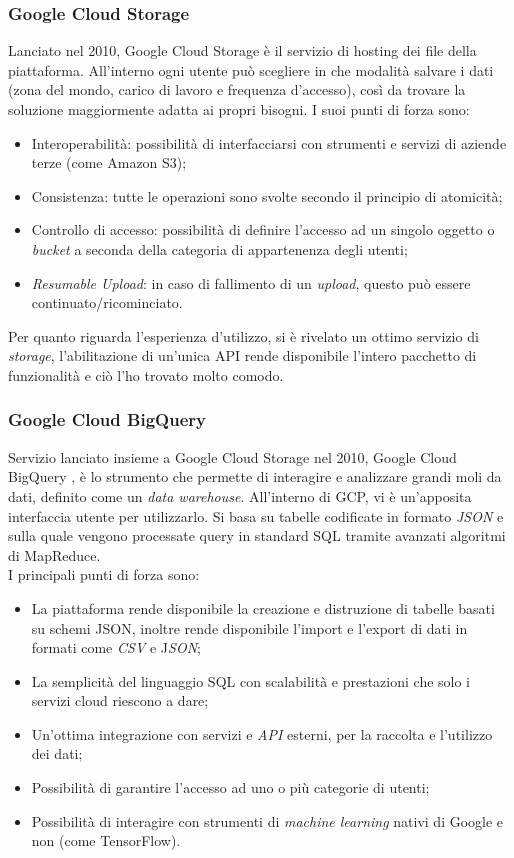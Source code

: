 \subsubsection{Google Cloud Storage}
Lanciato nel 2010, Google Cloud Storage è il servizio di hosting dei file della piattaforma. All'interno ogni utente può scegliere in che modalità salvare i dati (zona del mondo, carico di lavoro e frequenza d'accesso), così da trovare la soluzione maggiormente adatta ai propri bisogni.
I suoi punti di forza sono:
\begin{itemize}
	\item Interoperabilità: possibilità di interfacciarsi con strumenti e servizi di aziende terze (come Amazon S3);
	\item Consistenza: tutte le operazioni sono svolte secondo il principio di \Gls{atomicità};
	\item Controllo di accesso: possibilità di definire l'accesso ad un singolo oggetto o \emph{\gls{bucket}} a seconda della categoria di appartenenza degli utenti;
	\item \emph{Resumable Upload}: in caso di fallimento di un \emph{upload}, questo può essere continuato/ricominciato.
\end{itemize}

Per quanto riguarda l'esperienza d'utilizzo, si è rivelato un ottimo servizio di \emph{storage}, l'abilitazione di un'unica API rende disponibile l'intero pacchetto di funzionalità e ciò l'ho trovato molto comodo.
\subsubsection{Google Cloud BigQuery}
Servizio lanciato insieme a Google Cloud Storage nel 2010, Google Cloud BigQuery , è lo strumento che permette di interagire e analizzare grandi moli da dati, definito come un \emph{\gls{data warehouse}}. All'interno di GCP, vi è un'apposita interfaccia utente per utilizzarlo. Si basa su tabelle codificate in formato \emph{JSON} e sulla quale vengono processate query in standard SQL \cite{standardSQL} tramite avanzati algoritmi di \Gls{MapReduce}.
\\I principali punti di forza sono:
\begin{itemize}
	\item La piattaforma rende disponibile la creazione e distruzione di tabelle basati su schemi JSON, inoltre rende disponibile l'import e l'export di dati in formati come \emph{CSV} e J\emph{SON};
	\item La semplicità del linguaggio SQL con scalabilità e prestazioni che solo i servizi cloud riescono a dare;
	\item Un'ottima integrazione con servizi e \emph{API} esterni, per la raccolta e l'utilizzo dei dati;
	\item Possibilità di garantire l'accesso ad uno o più categorie di utenti;
	\item Possibilità di interagire con strumenti di \emph{machine learning} nativi di Google e non (come TensorFlow).
\end{itemize}

